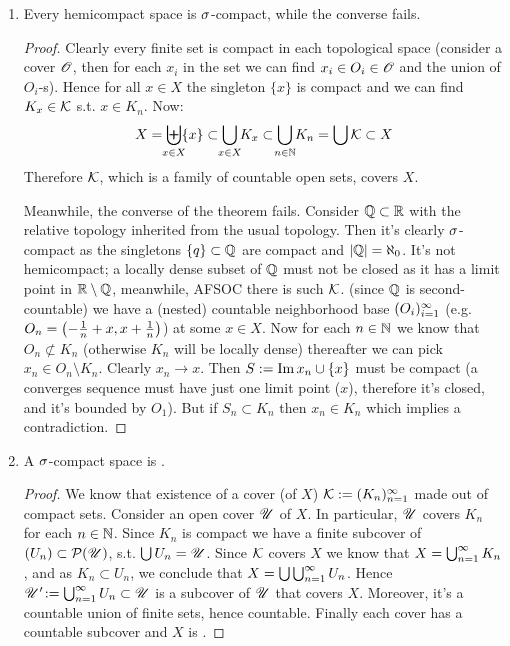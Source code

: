 \documentclass[a4paper]{article}
\begin{document}
	\begin{enumerate}
		\item Every hemicompact space is $\sigma$-compact, while the converse fails. \begin{proof}
			Clearly every finite set is compact in each topological space (consider a cover $\mathscr{O}$, then for each $x_i$ in the set we can find $x_i \in O_i \in \mathscr{O}$ and the union of $O_i$-s). Hence for all $x \in X$ the singleton $\{x\}$ is compact and we can find $K_x \in \mathcal{K}$ s.t. $x \in K_n$. Now: 
			\[ X = \biguplus_{\mathclap{x \in X}}\{x\} \subset \bigcup_{\mathclap{x \in X}} K_x \subset \bigcup_{\mathclap{n \in \N}} K_n = \bigcup \kc \subset X \]
			Therefore $\mathcal{K}$, which is a family of countable open sets, covers $X$. 
			
			Meanwhile, the converse of the theorem fails. Consider $\mathbb{Q} \subset \mathbb{R}$ with the relative topology inherited from the usual topology. Then it's clearly $\sigma$-compact as the singletons $\{q\} \subset \mathbb{Q}$ are compact and $\left \lvert \mathbb{Q} \right \rvert = \aleph_0$. It's not hemicompact; a locally dense subset of $\mathbb{Q}$ must not be closed as it has a limit point in $\mathbb{R} \setminus \mathbb{Q}$, meanwhile, AFSOC there is such $\mathcal{K}$. (since $\mathbb{Q}$ is second-countable) we have a (nested) countable neighborhood base $(O_i)_{i = 1}^{\infty}$ (e.g. $O_n = \left ( -\frac{1}{n} + x, x + \frac{1}{n} \right )$) at some $x \in X$. Now for each $n \in \mathbb{N}$ we know that $O_n \not\subset K_n$ (otherwise $K_n$ will be locally dense) thereafter we can pick $x_n \in O_n \setminus K_n$. Clearly $x_n \to x$. Then $S := \operatorname{Im} x_n \cup \{x\}$ must be compact (a converges sequence must have just one limit point ($x$), therefore it's closed, and it's bounded by $O_1$). But if $S_n \subset K_n$ then $x_n \in K_n$ which implies a contradiction. 
		\end{proof}
		\item A $\sigma$-compact space is \adolf. \begin{proof}
			We know that existence of a cover (of $X$) $\mathcal{K} := (K_n)_{n = 1}^{\infty}$ made out of compact sets. 
			Consider an open cover $\mathscr{U}$ of $X$. In particular, $\mathscr{U}$ covers $K_n$ for each $n \in \mathbb{N}$. Since $K_n$ is compact we have a finite subcover of $(U_n) \subset \mathcal{P}(\mathscr{U})$, s.t. $\bigcup U_n = \mathscr{U}$\!. Since $\mathcal{K}$ covers $X$ we know that $X = \bigcup_{n =1}^{\infty} K_n$, and as $K_n \subset U_n$, we conclude that $X = \bigcup\bigcup_{n = 1}^{\infty} U_n$. Hence $\mathscr{U}' \!:= \bigcup_{n = 1}^{\infty} U_n \subset \mathscr{U}$ is a subcover of $\mathscr{U}$ that covers $X$. Moreover, it's a countable union of finite sets, hence countable. Finally each cover has a countable subcover and $X$ is \adolf. 

\end{proof}
\end{enumerate}
\end{document}
